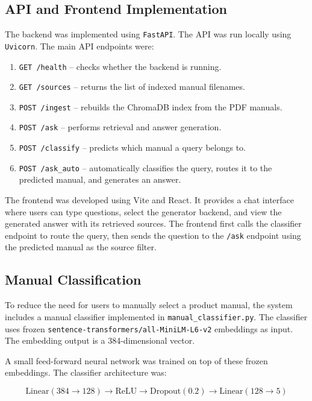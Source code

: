 \subsection{API and Frontend Implementation}

The backend was implemented using \texttt{FastAPI}. The API was run locally using \texttt{Uvicorn}. The main API endpoints were:

\begin{enumerate}
    \item \texttt{GET /health} -- checks whether the backend is running.
    \item \texttt{GET /sources} -- returns the list of indexed manual filenames.
    \item \texttt{POST /ingest} -- rebuilds the ChromaDB index from the PDF manuals.
    \item \texttt{POST /ask} -- performs retrieval and answer generation.
    \item \texttt{POST /classify} -- predicts which manual a query belongs to.
    \item \texttt{POST /ask\_auto} -- automatically classifies the query, routes it to the predicted manual, and generates an answer.
\end{enumerate}

The frontend was developed using Vite and React. It provides a chat interface where users can type questions, select the generator backend, and view the generated answer with its retrieved sources. The frontend first calls the classifier endpoint to route the query, then sends the question to the \texttt{/ask} endpoint using the predicted manual as the source filter.

\subsection{Manual Classification}

To reduce the need for users to manually select a product manual, the system includes a manual classifier implemented in \texttt{manual\_classifier.py}. The classifier uses frozen \texttt{sentence-transformers/all-MiniLM-L6-v2} embeddings as input. The embedding output is a 384-dimensional vector.

A small feed-forward neural network was trained on top of these frozen embeddings. The classifier architecture was:

\[
\text{Linear}(384 \rightarrow 128) \rightarrow \text{ReLU} \rightarrow \text{Dropout}(0.2) \rightarrow \text{Linear}(128 \rightarrow 5)
\]

